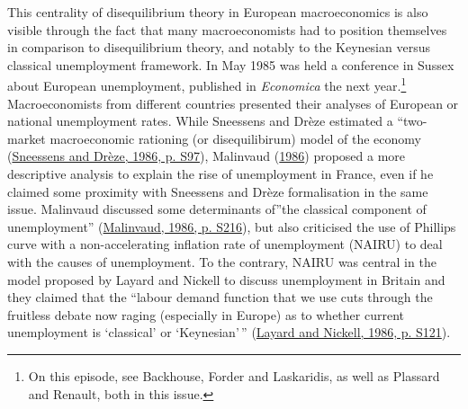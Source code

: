 \documentclass[
]{article}
\begin{document}
This centrality of disequilibrium theory in European macroeconomics is
also visible through the fact that many macroeconomists had to position
themselves in comparison to disequilibrium theory, and notably to the
Keynesian versus classical unemployment framework. In May 1985 was held
a conference in Sussex about European unemployment, published in
\emph{Economica} the next year.\footnote{On this episode, see Backhouse,
  Forder and Laskaridis, as well as Plassard and Renault, both in this
  issue.} Macroeconomists from different countries presented their
analyses of European or national unemployment rates. While Sneessens and
Drèze estimated a ``two-market macroeconomic rationing (or
disequilibirum) model of the economy
(\protect\hyperlink{ref-sneessens1986}{Sneessens and Drèze, 1986, p.
S97}), Malinvaud (\protect\hyperlink{ref-malinvaud1986}{1986}) proposed
a more descriptive analysis to explain the rise of unemployment in
France, even if he claimed some proximity with Sneessens and Drèze
formalisation in the same issue. Malinvaud discussed some determinants
of''the classical component of unemployment''
(\protect\hyperlink{ref-malinvaud1986}{Malinvaud, 1986, p. S216}), but
also criticised the use of Phillips curve with a non-accelerating
inflation rate of unemployment (NAIRU) to deal with the causes of
unemployment. To the contrary, NAIRU was central in the model proposed
by Layard and Nickell to discuss unemployment in Britain and they
claimed that the ``labour demand function that we use cuts through the
fruitless debate now raging (especially in Europe) as to whether current
unemployment is `classical' or `Keynesian'\,''
(\protect\hyperlink{ref-layard1986}{Layard and Nickell, 1986, p. S121}).
\end{document}
